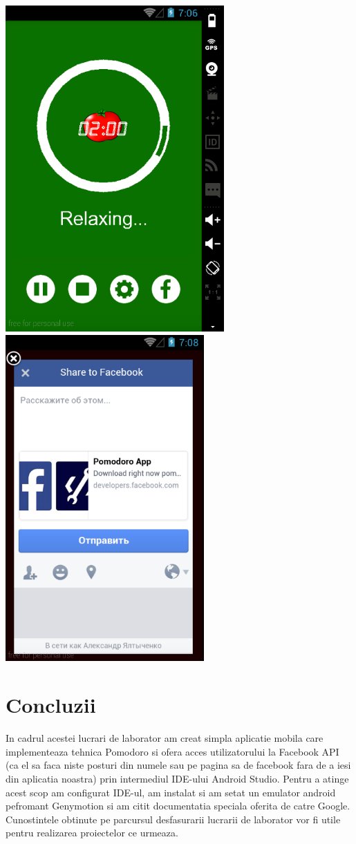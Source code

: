 \documentclass[12pt]{article}
\begin{document}
\includegraphics[height=12.5cm]{images/8}
\includegraphics[height=12.5cm]{images/9}
\section*{Concluzii}
In cadrul acestei lucrari de laborator am creat simpla aplicatie mobila care implementeaza tehnica Pomodoro si ofera acces utilizatorului la Facebook API (ca el sa faca niste posturi din numele sau pe pagina sa de facebook fara de a iesi din aplicatia noastra)  prin intermediul IDE-ului Android Studio. Pentru a atinge acest scop am configurat IDE-ul, am instalat si am setat un emulator android pefromant Genymotion si am citit documentatia speciala oferita de catre Google.  Cunostintele obtinute pe parcursul desfasurarii lucrarii de laborator vor fi utile pentru realizarea proiectelor ce urmeaza.
\newpage
\end{document}
